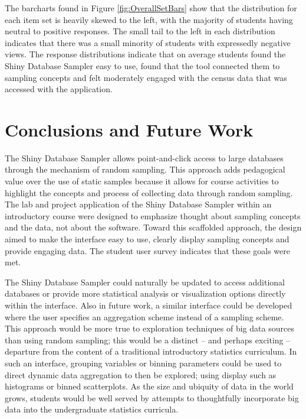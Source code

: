 \documentclass[11pt]{isuthesis}\usepackage[]{graphicx}\usepackage[]{color}
\begin{document}
The barcharts found in Figure \ref{fig:OverallSetBars} show that the distribution for each item set is heavily skewed to the left, with the majority of students having neutral to positive responses. The small tail to the left in each distribution indicates that there was a small minority of students with expressedly negative views. The response distributions indicate that on average students found the Shiny Database Sampler easy to use, found that the tool connected them to sampling concepts and felt moderately engaged with the census data that was accessed with the application. 


\section{Conclusions and Future Work}

The Shiny Database Sampler allows point-and-click access to large databases through the mechanism of random sampling. This approach adds pedagogical value over the use of static samples because it allows for course activities to highlight the concepts and process of collecting data through random sampling. The lab and project application of the Shiny Database Sampler within an introductory course were designed to emphasize thought about sampling concepts and the data, not about the software. Toward this scaffolded approach, the design aimed to make the interface easy to use, clearly display sampling concepts and provide engaging data. The student user survey indicates that these goals were met.

The Shiny Database Sampler could naturally be updated to access additional databases or provide more statistical analysis or visualization options directly within the interface. Also in future work, a similar interface could be developed where the user specifies an aggregation scheme instead of a sampling scheme. This approach would be more true to exploration techniques of big data sources than using random sampling; this would be a distinct -- and perhaps exciting -- departure from the content of a traditional introductory statistics curriculum. In such an interface, grouping variables or binning parameters could be used to direct dynamic data aggregation to then be explored; using display such as histograms or binned scatterplots. As the size and ubiquity of data in the world grows, students would be well served by attempts to thoughtfully incorporate big data into the undergraduate statistics curricula.
\end{document}
